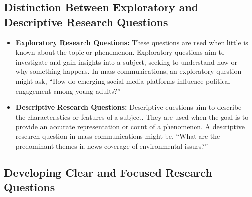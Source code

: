 \documentclass[
]{book}
\begin{document}
\hypertarget{distinction-between-exploratory-and-descriptive-research-questions}{%
\subsection*{Distinction Between Exploratory and Descriptive Research Questions}\label{distinction-between-exploratory-and-descriptive-research-questions}}

\begin{itemize}
\item
  \textbf{Exploratory Research Questions:} These questions are used when little is known about the topic or phenomenon. Exploratory questions aim to investigate and gain insights into a subject, seeking to understand how or why something happens. In mass communications, an exploratory question might ask, ``How do emerging social media platforms influence political engagement among young adults?''
\item
  \textbf{Descriptive Research Questions:} Descriptive questions aim to describe the characteristics or features of a subject. They are used when the goal is to provide an accurate representation or count of a phenomenon. A descriptive research question in mass communications might be, ``What are the predominant themes in news coverage of environmental issues?''
\end{itemize}

\hypertarget{developing-clear-and-focused-research-questions}{%
\subsection*{Developing Clear and Focused Research Questions}\label{developing-clear-and-focused-research-questions}}
\end{document}

